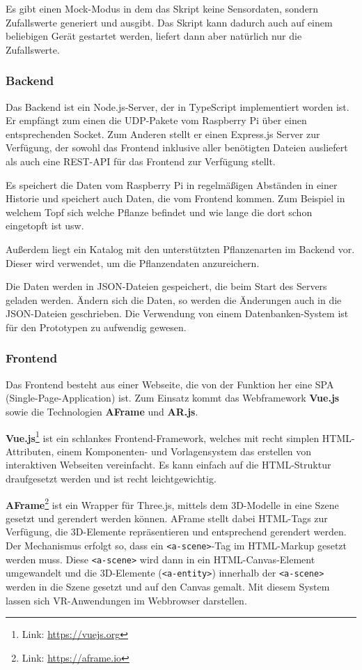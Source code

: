 Es gibt einen Mock-Modus in dem das Skript keine Sensordaten, sondern
Zufallswerte generiert und ausgibt. Das Skript kann dadurch auch auf
einem beliebigen Gerät gestartet werden, liefert dann aber natürlich nur
die Zufallswerte.

\hypertarget{backend}{%
\subsubsection{Backend}\label{backend}}

Das Backend ist ein Node.js-Server, der in TypeScript implementiert
worden ist. Er empfängt zum einen die UDP-Pakete vom Raspberry Pi über
einen entsprechenden Socket. Zum Anderen stellt er einen Express.js
Server zur Verfügung, der sowohl das Frontend inklusive aller benötigten
Dateien ausliefert als auch eine REST-API für das Frontend zur Verfügung
stellt.

Es speichert die Daten vom Raspberry Pi in regelmäßigen Abständen in
einer Historie und speichert auch Daten, die vom Frontend kommen. Zum
Beispiel in welchem Topf sich welche Pflanze befindet und wie lange die
dort schon eingetopft ist usw.

Außerdem liegt ein Katalog mit den unterstützten Pflanzenarten im
Backend vor. Dieser wird verwendet, um die Pflanzendaten anzureichern.

Die Daten werden in JSON-Dateien gespeichert, die beim Start des Servers
geladen werden. Ändern sich die Daten, so werden die Änderungen auch in
die JSON-Dateien geschrieben. Die Verwendung von einem
Datenbanken-System ist für den Prototypen zu aufwendig gewesen.

\hypertarget{frontend}{%
\subsubsection{Frontend}\label{frontend}}

Das Frontend besteht aus einer Webseite, die von der Funktion her eine
SPA (Single-Page-Application) ist. Zum Einsatz kommt das Webframework
\textbf{Vue.js} sowie die Technologien \textbf{AFrame} und
\textbf{AR.js}.

\textbf{Vue.js}\footnote{Link: \url{https://vuejs.org}} ist ein
schlankes Frontend-Framework, welches mit recht simplen HTML-Attributen,
einem Komponenten- und Vorlagensystem das erstellen von interaktiven
Webseiten vereinfacht. Es kann einfach auf die HTML-Struktur
draufgesetzt werden und ist recht leichtgewichtig.

\textbf{AFrame}\footnote{Link: \url{https://aframe.io}} ist ein Wrapper
für Three.js, mittels dem 3D-Modelle in eine Szene gesetzt und gerendert
werden können. AFrame stellt dabei HTML-Tags zur Verfügung, die
3D-Elemente repräsentieren und entsprechend gerendert werden. Der
Mechanismus erfolgt so, dass ein
\texttt{\textless{}a-scene\textgreater{}}-Tag im HTML-Markup gesetzt
werden muss. Diese \texttt{\textless{}a-scene\textgreater{}} wird dann
in ein HTML-Canvas-Element umgewandelt und die 3D-Elemente
(\texttt{\textless{}a-entity\textgreater{}}) innerhalb der
\texttt{\textless{}a-scene\textgreater{}} werden in die Szene gesetzt
und auf den Canvas gemalt. Mit diesem System lassen sich VR-Anwendungen
im Webbrowser darstellen.

